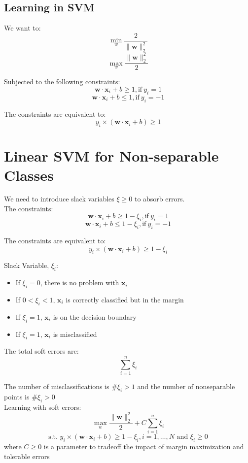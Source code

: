 \begin{multicols}{2}
\subsection{Learning in SVM}

\noindent We want to:
$$\!\min_w \frac{2}{\| \mathbf{w} \|_2^2}$$
$$\!\max_w \frac{\| \mathbf{w} \|_2^2}{2}$$

\noindent Subjected to the following constraints:
$$\mathbf{w} \cdot \mathbf{x}_i + b \ge 1, \text{if}\ y_i=1$$
$$\mathbf{w} \cdot \mathbf{x}_i + b \le 1, \text{if}\ y_i=-1$$

\noindent The constraints are equivalent to:
$$y_i \times (\mathbf{w} \cdot \mathbf{x}_i + b) \ge 1$$

\section{Linear SVM for Non-separable Classes}

\noindent We need to introduce slack variables $\xi \ge 0$ to absorb errors. \\

\noindent The constraints:
$$\mathbf{w} \cdot \mathbf{x}_i + b \ge 1 - \xi_i, \text{if}\ y_i=1$$
$$\mathbf{w} \cdot \mathbf{x}_i + b \le 1 - \xi_i, \text{if}\ y_i=-1$$

\noindent The constraints are equivalent to:
$$y_i \times (\mathbf{w} \cdot \mathbf{x}_i + b) \ge 1 - \xi_i$$

\noindent Slack Variable, $\xi_i$:
\begin{itemize}
    \item If $\xi_i=0$, there is no problem with $\mathbf x_i$
    \item If $0<\xi_i<1$, $\mathbf x_i$ is correctly classified but in the margin
    \item If $\xi_i=1$, $\mathbf x_i$ is on the decision boundary
    \item If $\xi_i=1$, $\mathbf x_i$ is misclassified
\end{itemize}

\noindent The total soft errors are:
$$\sum_{i=1}^n \xi_i$$

\noindent The number of misclassifications is \#{$\xi_i > 1$} and the number of nonseparable points is \#{$\xi_i > 0$} \\

\noindent Learning with soft errors:
$$\!\max_w \frac{\| \mathbf{w} \|_2^2}{2} + C \sum_{i=1}^n \xi_i$$
$$\text{s.t. } y_i \times (\mathbf{w} \cdot \mathbf{x}_i + b) \ge 1 - \xi_i, i=1,\ldots,N \text{ and } \xi_i \ge 0$$
\noindent where $C \ge 0$ is a parameter to tradeoff the impact of margin maximization and tolerable errors

\end{multicols}

